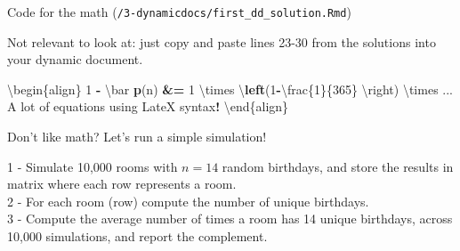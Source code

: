 \documentclass[ignorenonframetext,]{beamer}
\newenvironment{Shaded}{\begin{snugshade}}{\end{snugshade}}
\newcommand{\DecValTok}[1]{\textcolor[rgb]{0.00,0.00,0.81}{#1}}
\newcommand{\ErrorTok}[1]{\textcolor[rgb]{0.64,0.00,0.00}{\textbf{#1}}}
\newcommand{\KeywordTok}[1]{\textcolor[rgb]{0.13,0.29,0.53}{\textbf{#1}}}
\newcommand{\NormalTok}[1]{#1}
\newcommand{\OperatorTok}[1]{\textcolor[rgb]{0.81,0.36,0.00}{\textbf{#1}}}
\newcommand{\StringTok}[1]{\textcolor[rgb]{0.31,0.60,0.02}{#1}}
\begin{document}
\begin{frame}[fragile]{Code for the math
(\texttt{/3-dynamicdocs/first\_dd\_solution.Rmd})}
\protect\hypertarget{code-for-the-math-3-dynamicdocsfirst_dd_solution.rmd}{}

Not relevant to look at: just copy and paste lines 23-30 from the
solutions into your dynamic document.

\begin{Shaded}
\begin{Highlighting}[]
\NormalTok{\textbackslash{}begin\{align\} }
 \DecValTok{1} \OperatorTok{-}\StringTok{ }\NormalTok{\textbackslash{}bar }\KeywordTok{p}\NormalTok{(n) }\OperatorTok{&}\ErrorTok{=}\StringTok{ }\DecValTok{1}\NormalTok{ \textbackslash{}times \textbackslash{}}\KeywordTok{left}\NormalTok{(}\DecValTok{1}\OperatorTok{-}\NormalTok{\textbackslash{}frac\{}\DecValTok{1}\NormalTok{\}\{}\DecValTok{365}\NormalTok{\}}
\NormalTok{                                 \textbackslash{}right) }
\NormalTok{ \textbackslash{}times ...}
\NormalTok{ A lot of equations using LateX syntax}\OperatorTok{!}
\NormalTok{\textbackslash{}end\{align\}}
\end{Highlighting}
\end{Shaded}

\end{frame}

\begin{frame}{Don't like math? Let's run a simple simulation!}
\protect\hypertarget{dont-like-math-lets-run-a-simple-simulation}{}

1 - Simulate 10,000 rooms with \(n = 14\) random birthdays, and store
the results in matrix where each row represents a room.\\
2 - For each room (row) compute the number of unique birthdays.\\
3 - Compute the average number of times a room has 14 unique birthdays,
across 10,000 simulations, and report the complement.

\end{frame}
\end{document}
